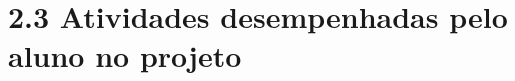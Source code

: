 \hypertarget{__RefHeading___Toc4806_3790000799}{}
\hypertarget{_Toc45627145}{}
\section*{2.3 Atividades desempenhadas pelo aluno no projeto}
\label{unit:chapter-02-text-h-0014}

